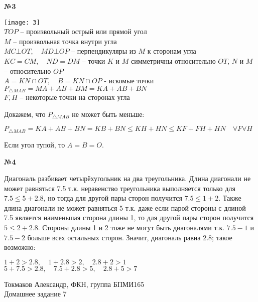 \documentclass{article}
\newenvironment{task}{\begin{center}\fontsize{14}{14}\selectfont\bf}{\rm\fontsize{12}{12}\selectfont\end{center}}
\begin{document}
	\begin{task} 
		№3
	\end{task}
	\begin{center}
		\texttt{[image: 3]}\\
		$TOP$ -- произвольный острый или прямой угол \\
		$M$ -- произвольная точка внутри угла\\
		$MC \bot OT, \quad MD \bot OP$ -- перпендикуляры из $M$ к сторонам угла \\
		$KC = CM, \quad ND=DM$ -- точки $K$ и $M$ симметричны относительно $OT$, $N$ и $M$ -- относительно $OP$ \\
		$A = KN \cap OT, \quad B = KN \cap OP$ - искомые точки \\
		$P_{\triangle MAB} = MA + AB + BM = KA + AB + BN$ \\
		$F, H$ -- некоторые точки на сторонах угла 
	\end{center}
	Докажем, что $P_{\triangle MAB}$ не может быть меньше:
	\begin{center}
		$P_{\triangle MAB} = KA + AB + BN = KB + BN \leq KH + HN \leq KF + FH + HN \quad \forall F \forall H$ 
	\end{center}
	Если угол тупой, то $A = B = O$.
	
	 
	

	\begin{task} 
		№4
	\end{task}
	Диагональ разбивает четырёхугольник на два треугольника. Длина диагонали не может равняться 7.5 т.к. неравенство треугольника выполняется только для $7.5 \leq 5 + 2.8$, но тогда для другой пары сторон получится $7.5 \leq 1 + 2$. Также длина диагонали не может равняться 5 т.к. даже если парой стороны с длиной 7.5 является наименьшая сторона длины 1, то для другой пары сторон получится $5 \leq 2 + 2.8$. 
    Стороны длины 1 и 2 тоже не могут быть диагоналями т.к. $7.5 - 1$ и $7.5 - 2$ больше всех остальных сторон. Значит, диагональ равна 2.8; такое возможно:
    \begin{center}
    	$1 + 2 > 2.8, \quad 1 + 2.8 > 2, \quad 2.8 + 2 > 1$ \\
    	$5 + 7.5 > 2.8, \quad 7.5 + 2.8 > 5, \quad 2.8 + 5 > 7$ 
    \end{center}
     
	
	\newpage
	\begin{center}
		Токмаков Александр, ФКН, группа БПМИ165 \\
		Домашнее задание 7
	\end{center}
	
\end{document}
